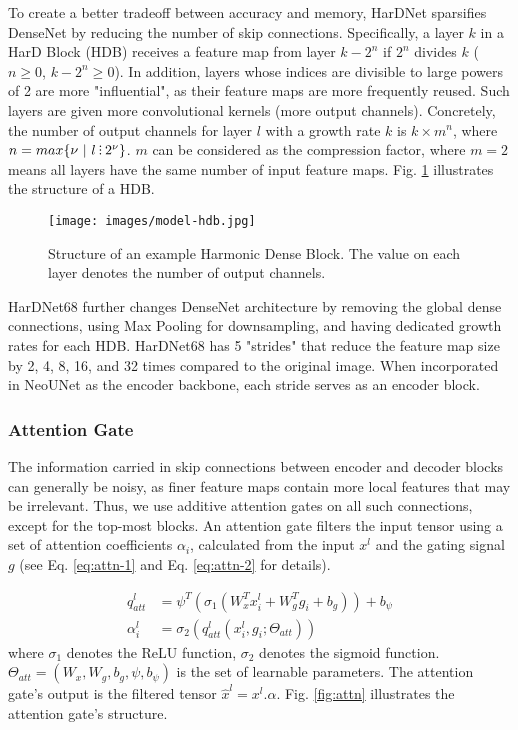 \documentclass[runningheads]{llncs}
\newcommand{\ModelName}{NeoUNet\xspace}
\newcommand*{\divby}{\mathrel{\rotatebox{90}{$\hskip-1pt.{}.{}.$}}}
\begin{document}
	To create a better tradeoff between accuracy and memory, HarDNet sparsifies DenseNet by reducing the number of skip connections. Specifically, a layer $k$ in a HarD Block (HDB) receives a feature map from layer $k - 2^n$ if $2^n$ divides $k$ ($n \geq 0$, $k - 2^n \geq 0$). In addition, layers whose indices are divisible to large powers of 2 are more "influential", as their feature maps are more frequently reused. Such layers are given more convolutional kernels (more output channels). Concretely, the number of output channels for layer $l$ with a growth rate $k$ is $k \times m^n$, where $n = max \{\nu \ | \ l \divby 2^{\nu} \}$. $m$ can be considered as the compression factor, where $m = 2$ means all layers have the same number of input feature maps. Fig. \ref{fig:model-hdb} illustrates the structure of a HDB.

	\begin{figure}
		\centering
		\texttt{[image: images/model-hdb.jpg]}
		\caption{Structure of an example Harmonic Dense Block. The value on each layer denotes the number of output channels.}
		\label{fig:model-hdb}
	\end{figure}

	HarDNet68 further changes DenseNet architecture by removing the global dense connections, using Max Pooling for downsampling, and having dedicated growth rates for each HDB. HarDNet68 has 5 "strides" that reduce the feature map size by 2, 4, 8, 16, and 32 times compared to the original image. When incorporated in \ModelName as the encoder backbone, each stride serves as an encoder block.

	\subsubsection{Attention Gate}
	The information carried in skip connections between encoder and decoder blocks can generally be noisy, as finer feature maps contain more local features that may be irrelevant. Thus, we use additive attention gates \cite{oktay2018attention} on all such connections, except for the top-most blocks. An attention gate filters the input tensor using a set of attention coefficients $\alpha_i$, calculated from the input $x^l$ and the gating signal $g$ (see Eq. \eqref{eq:attn-1} and Eq. \eqref{eq:attn-2} \cite{oktay2018attention} for details).

	\begin{align}
	\label{eq:attn-1}
	q^l_{att} & = \psi^T (\sigma_1 (W^T_x x^l_i + W^T_g g_i + b_g)) + b_{\psi} \\
	\label{eq:attn-2}
	\alpha^l_i & = \sigma_2 (q^l_{att}(x^l_i, g_i; \Theta_{att}))
	\end{align}
	where $\sigma_1$ denotes the ReLU function, $\sigma_2$ denotes the sigmoid function. $\Theta_{att} = (W_x, W_g, b_g, \psi, b_{\psi})$ is the set of learnable parameters. The attention gate's output is the filtered tensor $\hat{x}^l = x^l . \alpha$. Fig. \ref{fig:attn} illustrates the attention gate's structure.
\end{document}
